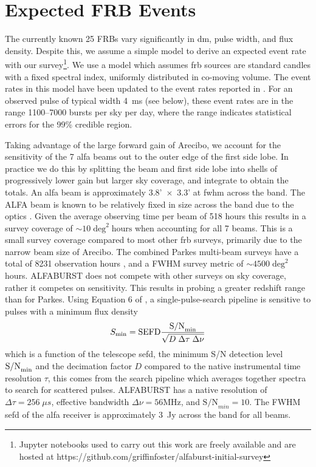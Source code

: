 \documentclass[a4paper,fleqn,usenatbib]{mnras}
\begin{document}
\section{Expected FRB Events}
\label{sec:event_rates}

The currently known 25 FRBs vary significantly in \gls{dm}, pulse width, and
flux density. Despite this, we assume a simple model to derive an expected event
rate with our survey\footnote{Jupyter notebooks used to carry out this work are
freely available and are hosted at
https://github.com/griffinfoster/alfaburst-initial-survey}.  We use a model
\citep[see equation 9 of][]{2013MNRAS.436L...5L} which assumes \gls{frb} sources
are standard candles with a fixed spectral index, uniformly distributed in
co-moving volume. The event rates in this model have been updated to the
event rates reported in \cite{2016MNRAS.460.3370C}. For an observed pulse of
typical width 4~ms (see below), these event rates are in the range 1100--7000
bursts per sky per day, where the range indicates statistical errors for the
99\% credible region.

Taking advantage of the large forward gain of Arecibo, we account for the
sensitivity of the 7 \gls{alfa} beams out to the outer edge of the first side lobe.
In practice we do this by splitting the beam and first side lobe into shells of
progressively lower gain but larger sky coverage, and integrate to obtain the
totals.  An \gls{alfa} beam is approximately 3.8'~$\times$~3.3' at \gls{fwhm}
across the band.  The ALFA beam is known to be relatively fixed in size
across the band due to the optics \citep{GALFAbeam}.  Given the average
observing time per beam of 518 hours this results in a survey coverage of $\sim
10 \; \textrm{deg}^2 \; \textrm{hours}$ when accounting for all 7 beams. This is
a small survey coverage compared to most other \gls{frb} surveys, primarily due
to the narrow beam size of Arecibo. The combined Parkes multi-beam surveys have
a total of 8231 observation hours \citep{2016MNRAS.460.3370C}, and a FWHM survey
metric of $\sim 4500 \; \textrm{deg}^2$ hours.  ALFABURST does not compete with
other surveys on sky coverage, rather it competes on sensitivity. This results
in probing a greater redshift range than for Parkes. Using Equation 6 of
\cite{2015MNRAS.452.1254K}, a  single-pulse-search pipeline is sensitive to
pulses with a minimum flux density
%
\begin{equation}
S_{\rm min} = \textrm{SEFD} \frac{\textrm{S/N}_{\rm min}}{\sqrt{D \; \Delta \tau \;
\Delta \nu}}
\end{equation}
%
which is a function of the telescope \gls{sefd}, the minimum S/N detection level
$\textrm{S/N}_{\rm min}$ and the decimation factor $D$ compared to the native
instrumental time resolution $\tau$, this comes from the search pipeline which
averages together spectra to search for scattered pulses. ALFABURST has a native
resolution of $\Delta \tau = 256 \; \mu s$, effective bandwidth $\Delta \nu = 56
\textrm{MHz}$, and $\textrm{S/N}_{min} = 10$. The FWHM \gls{sefd} of the
\gls{alfa} receiver is approximately 3~Jy across the band for all beams.
\end{document}
